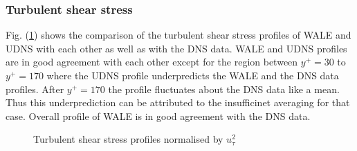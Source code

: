 \subsubsection{Turbulent shear stress}
Fig. (\ref{uvrms udns vs wale}) shows the comparison of the turbulent shear stress profiles of WALE and UDNS with each other as well as with the DNS data. WALE and UDNS profiles are in good agreement with each other except for the region between $y^+ = 30$ to $y^+ = 170$ where the UDNS profile underpredicts the WALE and the DNS data profiles. After $y^+ = 170$ the profile fluctuates about the DNS data like a mean. Thus this underprediction can be attributed to the insufficinet averaging for that case. Overall profile of WALE is in good agreement with the DNS data. 
%
\begin{figure}[h!]
\begin{minipage}[b]{0.5\textwidth}
\end{minipage}
%
\begin{minipage}[b]{0.5\textwidth}
\end{minipage}
\caption{Turbulent shear stress profiles normalised by $u_\tau^2$}
\label{uvrms udns vs wale}
\end{figure} 
%

